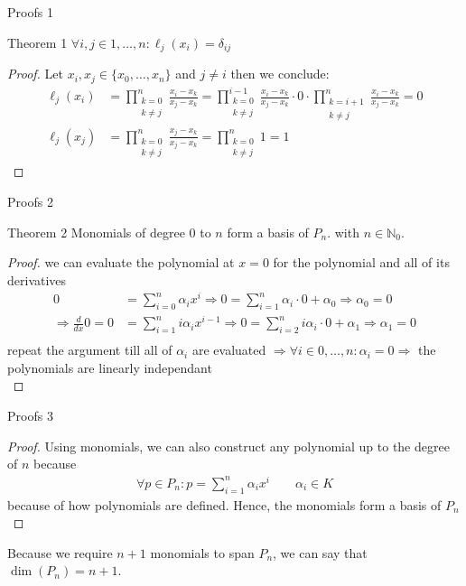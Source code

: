 \documentclass[8pt]{beamer}
\begin{document}
	\begin{frame}{Proofs 1}
		\begin{block}{Theorem 1}
			$\forall i,j \in1,\ldots,n:\ell_j(x_i) = \delta_{ij}$
		\end{block}
		\begin{proof}
			Let $x_i, x_j \in \{x_0, \ldots, x_n \}$ and $j \neq i$ then we conclude: 
			\begin{align*}
				\ell_j(x_i) &= \prod_{\substack{k= 0 \\ k \neq j }}^{n}\frac{x_i - x_k}{x_j - x_k} = \prod_{\substack{k= 0 \\ k \neq j}}^{i-1}\frac{x_i - x_k}{x_j - x_k} \cdot 0 \cdot \prod_{\substack{k= i+1 \\ k \neq j}}^{n}\frac{x_i - x_k}{x_j - x_k} = 0 \\
				\ell_j(x_j) &= \prod_{\substack{k= 0 \\ k \neq j }}^{n}\frac{x_j - x_k}{x_j - x_k} =  \prod_{\substack{k= 0 \\ k \neq j }}^{n} 1 = 1
			\end{align*}
		\end{proof}
	\end{frame}
			
	\begin{frame}{Proofs 2}
		\begin{block}{Theorem 2}
			Monomials of degree $0$ to $n$ form a basis of $P_n$. with $n \in \mathbb{N}_0$.
		\end{block}
		\begin{proof}
 			we can evaluate the polynomial at $x = 0$ for the polynomial and all of its derivatives
			\begin{align*}
				0 &= \sum_{i=0}^{n}\alpha_i x^i \Rightarrow 0  =\sum_{i=1}^{n}\alpha_i \cdot 0 + \alpha_0 \Rightarrow \alpha_0 = 0\\
				\Rightarrow \frac{d}{dx} 0 = 0 &=\sum_{i=1}^{n}i\alpha_i x^{i-1} \Rightarrow 0  =\sum_{i=2}^{n}i\alpha_i \cdot 0 + \alpha_1 \Rightarrow \alpha_1 = 0\\
			\end{align*}
			repeat the argument till all of $\alpha_i$ are evaluated $\Rightarrow \forall i \in 0, \ldots, n: \alpha_i = 0\Rightarrow$ the polynomials are linearly independant\\
		\end{proof}

		\end{frame}
			
		\begin{frame}{Proofs 3}
			\begin{proof}
				Using monomials, we can also construct any polynomial up to the degree of $n$ because
				\begin{align*}
					\forall p \in P_n : p = \sum_{i=1}^{n}\alpha_i x^i \qquad \alpha_i\in K 
				\end{align*}
				because of how polynomials are defined. Hence, the monomials form a basis of $P_n$\\
			\end{proof}
			Because we require $n+1$ monomials to span $P_n$, we can say that $\dim(P_n) = n+1$.
			
		\end{frame}
							
\end{document}
